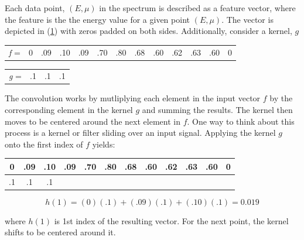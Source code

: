 \noindent Each data point, $ (E, \mu) $ in the spectrum is described as a feature vector, where the feature is the the energy value for a given point $ (E, \mu) $. The vector is depicted in (\ref{conv-squares}) with zeros padded on both sides. Additionally, consider a kernel, $ g $  

\begin{table}[h!]
    \centering
    \begin{tabular}{c|c|c|c|c|c|c|c|c|c|c|c|c|}
    \cline{2-13}
    \textit{f} = & 0 & .09 & .10 & .09 & .70 & .80 & .68 & .60 & .62 & .63 & .60 & 0 \\ \cline{2-13}
    \end{tabular}
    \label{conv-squares}
\end{table}

\begin{table}[h!]
\centering
    \begin{tabular}{lccc}
    \cline{2-4}
    \multicolumn{1}{l|}{\textit{g} =} & \multicolumn{1}{c|}{.1} & \multicolumn{1}{c|}{.1} & \multicolumn{1}{c|}{.1} \\ \cline{2-4}                 
    \end{tabular}
\end{table}

\noindent The convolution works by mutliplying each element in the input vector $ f $ by the corresponding element in the kernel $ g $ and summing the results. The kernel then moves to be centered around the next element in $ f $. One way to think about this process is a kernel or filter sliding over an input signal. Applying the kernel $ g $ onto the first index of $ f $ yields: 

\begin{table}[h!]
    \centering
    \begin{tabular}{|c|c|c|c|c|c|c|c|c|c|c|c|}
    \hline
    0  & .09 & .10 & .09 & .70 & \multicolumn{1}{c|}{.80} & \multicolumn{1}{c|}{.68} & \multicolumn{1}{c|}{.60} & .62 & .63 & .60 & 0 \\ \hline
    .1 & .1  & .1  &     &     &                          &                          &                          &     &     &     &   \\ \hline
    \end{tabular}
\end{table}
$$ 
h(1) = (0)(.1) + (.09)(.1) + (.10)(.1) = 0.019
$$

\noindent where $ h(1) $ is 1st index of the resulting vector. For the next point, the kernel shifts to be centered around it. 

